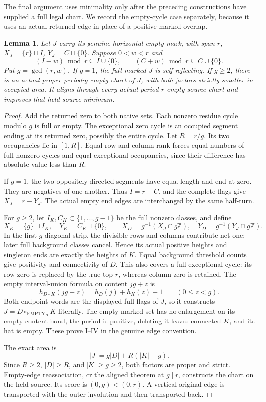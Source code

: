 \documentclass[11pt,a4paper]{amsart}
\numberwithin{equation}{section}
\theoremstyle{plain}
\newtheorem{lemma}[theorem]{Lemma}
\theoremstyle{definition}
\newcommand{\Z}{\mathbb Z}
\begin{document}
The final argument uses minimality only after the preceding constructions
have supplied a full legal chart.  We record the empty-cycle case
separately, because it uses an actual returned edge in place of a positive
marked overlap.
\begin{lemma}\label{rt:empty-cycles}
Let \(J\) carry its genuine horizontal empty mark, with span \(r\),
\(X_J=\{r\}\sqcup I\), \(Y_J=C\sqcup\{0\}\).
Suppose \(0<w<r\) and
\[
 (I-w)\bmod r\subseteq I\cup\{0\},\qquad
 (C+w)\bmod r\subseteq C\cup\{0\}.
\]
Put \(g=\gcd(r,w)\).  If \(g=1\), the full marked \(J\) is
self-reflecting.  If \(g\ge2\), there is an actual proper
period-\(g\) empty chart of \(J\), with both factors strictly smaller
in occupied area.  It aligns through every actual period-\(r\) empty
source chart and improves that held source minimum.
\end{lemma}
\begin{proof}
Add the returned zero to both native sets.  Each nonzero residue cycle
modulo \(g\) is full or empty.  The exceptional zero cycle is an
occupied segment ending at its returned zero, possibly the entire
cycle.  Let \(R=r/g\).  Its two occupancies lie in \([1,R]\).
Equal row and column rank forces equal numbers of full nonzero cycles
and equal exceptional occupancies, since their difference has absolute
value less than \(R\).

If \(g=1\), the two oppositely directed segments have equal length
and end at zero.  They are negatives of one another.  Thus
\(I=r-C\), and the complete flags give \(X_J=r-Y_J\).
The actual empty end edges are interchanged by the same half-turn.

For \(g\ge2\), let \(I_K,C_K\subset\{1,\ldots,g-1\}\) be the
full nonzero classes, and define
\[
 X_K=\{g\}\sqcup I_K,\quad Y_K=C_K\sqcup\{0\},\qquad
 X_D=g^{-1}(X_J\cap g\Z),\quad
 Y_D=g^{-1}(Y_J\cap g\Z).
\]
In the first \(g\)-diagonal strip, the divisible rows and columns
contribute net one; later full background classes cancel.  Hence its
actual positive heights and singleton ends are exactly the heights of
\(K\).  Equal background threshold counts give positivity and
connectivity of \(D\).  This also covers a full exceptional cycle:
its row zero is replaced by the true top \(r\), whereas column zero
is retained.  The empty interval-union formula on content \(jg+z\) is
\[
 h_{D\circ K}(jg+z)=h_D(j)+h_K(z)-1\qquad(0\le z<g).
\]
Both endpoint words are the displayed full flags of \(J\), so it
constructs \(J=D\circ_{\mathrm{EMPTY}_H}K\) literally.
The empty marked set has no enlargement on its empty content band,
the period is positive, deleting it leaves connected \(K\), and its
hat is empty.  These prove I--IV in the genuine edge convention.

The exact area is
\[
 |J|=g|D|+R(|K|-g).
\]
Since \(R\ge2\), \(|D|\ge R\), and \(|K|\ge g\ge2\),
both factors are proper and strict.  Empty-edge reassociation, or the
aligned theorem at \(g\mid r\), constructs the chart on the held
source.  Its score is \((0,g)<(0,r)\).  A vertical original edge
is transported with the outer involution and then transported back.
\end{proof}
\end{document}
